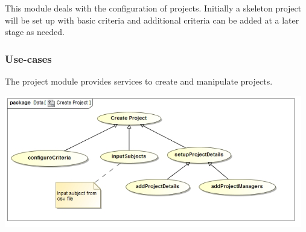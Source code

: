 This module deals with the configuration of projects. Initially a skeleton project will be set up with basic criteria 
and additional criteria can be added at a later stage as needed.
\subsubsection{Use-cases}
The project module provides services to create and manipulate projects.\par
\includegraphics[width=13cm]{./graphics/createProjectUseCase.jpg}
    \rule{0\linewidth}{0.15\linewidth}\par
